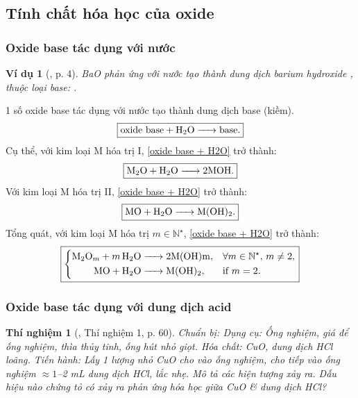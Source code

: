 \documentclass{article}
\newtheorem{thinghiem}{Thí nghiệm}
\newtheorem{vidu}{Ví dụ}
\begin{document}
\subsection{Tính chất hóa học của oxide}

\subsubsection{Oxide base tác dụng với nước}

\begin{vidu}[\cite{SGK_Hoa_Hoc_9}, p. 4]
	\emph{BaO} phản ứng với nước tạo thành dung dịch \emph{barium hydroxide }, thuộc loại base: \emph{}.
\end{vidu}
1 số oxide base tác dụng với nước tạo thành dung dịch base (kiềm).
\begin{align}
	\label{oxide base + H2O}
	\boxed{\mbox{oxide base} + \ce{H2O ->} \mbox{base}.}
\end{align}
Cụ thể, với kim loại M hóa trị I, \eqref{oxide base + H2O} trở thành:
\begin{align}
	\boxed{\ce{M2O + H2O -> $2$MOH}.}
\end{align}
Với kim loại M hóa trị II, \eqref{oxide base + H2O} trở thành:
\begin{align*}
	\boxed{\ce{MO + H2O -> M(OH)2}.}
\end{align*}
Tổng quát, với kim loại M hóa trị $m\in\mathbb{N}^\star$, \eqref{oxide base + H2O} trở thành:
\begin{equation*}
	\boxed{\left\{\begin{split}
		\ce{M2O_m + $m$H2O &-> $2$M(OH)m},&&\forall m\in\mathbb{N}^\star,\,m\ne2,\\
		\ce{MO + H2O &-> M(OH)2},&&\mbox{if } m = 2.
	\end{split}\right.}
\end{equation*}

\subsubsection{Oxide base tác dụng với dung dịch acid}

\begin{thinghiem}[\cite{SGK_KHTN_8_Canh_Dieu}, Thí nghiệm 1, p. 60]
	\emph{Chuẩn bị:} Dụng cụ: Ống nghiệm, giá để ống nghiệm, thìa thủy tinh, ống hút nhỏ giọt. Hóa chất: \emph{CuO}, dung dịch \emph{HCl} loãng. \emph{Tiến hành:} Lấy 1 lượng nhỏ \emph{CuO} cho vào ống nghiệm, cho tiếp vào ống nghiệm $\approx1$\emph{--2 mL} dung dịch \emph{HCl}, lắc nhẹ. Mô tả các hiện tượng xảy ra. Dấu hiệu nào chứng tỏ có xảy ra phản ứng hóa học giữa \emph{CuO} \& dung dịch \emph{HCl}?
\end{thinghiem}
\end{document}
